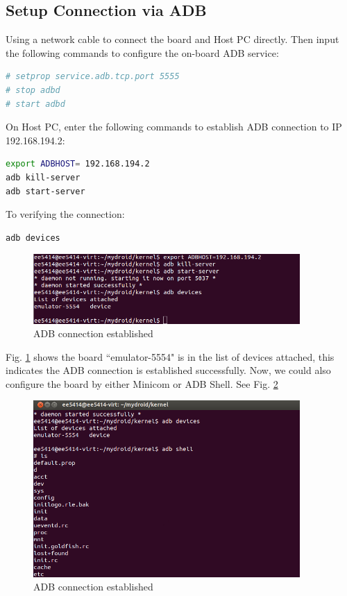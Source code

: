\documentclass[10pt,journal,draftclsnofoot,onecolumn]{IEEEtran}
\begin{document}
    \subsection{Setup Connection via ADB}
Using a network cable to connect the board and Host PC directly. Then input the following commands to configure the on-board ADB service:
\begin{lstlisting}[language={bash}]
# setprop service.adb.tcp.port 5555
# stop adbd
# start adbd
\end{lstlisting}
On Host PC, enter the following commands to establish ADB connection to IP 192.168.194.2:
\begin{lstlisting}[language={bash}]
export ADBHOST= 192.168.194.2
adb kill-server
adb start-server
\end{lstlisting}
To verifying the connection:
\begin{lstlisting}[language={bash}]
adb devices
\end{lstlisting}
\begin{figure}[ht]
    \centering
    \includegraphics[width=4in]{./figs/lab2.png}
    \caption{ADB connection established}
    \label{lab2}
\end{figure}
Fig. \ref{lab2} shows the board ``emulator-5554" is in the list of devices attached, this indicates the ADB connection is established successfully.
Now, we could also configure the board by either Minicom or ADB Shell. See Fig. \ref{lab3}
\begin{figure}[ht]
    \centering
    \includegraphics[width=4in]{./figs/lab3.png}
    \caption{ADB connection established}
    \label{lab3}
\end{figure}
\end{document}
